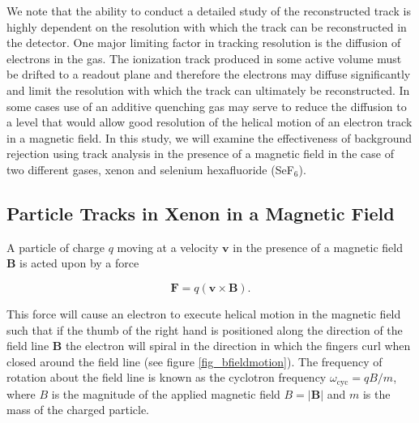 \documentclass{JINST}
\begin{document}
We note that the ability to conduct a detailed study of the reconstructed track is highly dependent on the resolution
with which the track can be reconstructed in the detector.  One major limiting factor in tracking resolution is the diffusion
of electrons in the gas.  The ionization track produced in some active volume must be drifted to a readout plane and 
therefore the electrons may diffuse significantly and limit the resolution with which the track can ultimately be
reconstructed.  In some cases use of an additive quenching gas may serve to reduce the diffusion to a level that would 
allow good resolution of the helical motion of an electron track in a magnetic field.  In this study, we will examine the
effectiveness of background rejection using track analysis in the presence of a magnetic field in the case of two 
different gases, xenon and selenium hexafluoride (SeF$_6$).


\subsection{Particle Tracks in Xenon in a Magnetic Field}\label{ssec:magmotion}
A particle of charge $q$ moving at a velocity $\mathbf{v}$ in the presence of a magnetic field $\mathbf{B}$ is acted 
upon by a force

\begin{equation}
\mathbf{F} = q(\mathbf{v} \times \mathbf{B}).
\end{equation}

This force will cause an electron to execute helical motion in the magnetic field such that if the thumb of the right hand is positioned along the direction of the field line $\mathbf{B}$ the electron will spiral in the direction in which the fingers curl when closed around the field line (see figure \ref{fig_bfieldmotion}).  The frequency of rotation about the field line is known as the cyclotron frequency $\omega_{\mathrm{cyc}} = qB/m$, where $B$ is the magnitude of the applied magnetic field $B = |\mathbf{B}|$ and $m$ is the mass of the charged particle.
\end{document}
